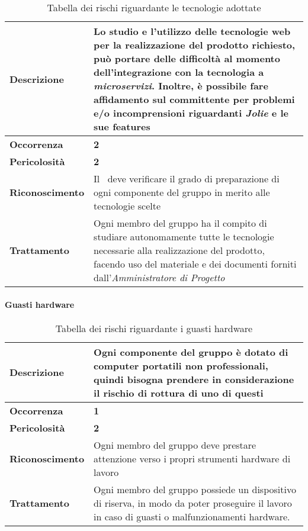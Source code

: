 \begin{table}[H]
	\begin{center}
		\begin{tabular}{|>{\centering\arraybackslash} m{3cm}  ||>{\centering\arraybackslash} m{10cm}|}
			\hline
			\textbf{Descrizione}	& Lo studio e l'utilizzo delle tecnologie web per la realizzazione del prodotto richiesto, può portare delle difficoltà al momento dell'integrazione con la tecnologia a \textit{microservizi\ped{G}}. Inoltre, è possibile fare affidamento sul committente per problemi e/o incomprensioni riguardanti \textit{Jolie\ped{G}} e le sue features \\
			\hline
			\textbf{Occorrenza}	&	\textbf{2}	\\
			\hline
			\textbf{Pericolosità}	&	\textbf{2}	\\
			\hline
			\textbf{Riconoscimento}	&	Il \textit{\RdP}\ deve verificare il grado di preparazione di ogni componente del gruppo in merito alle tecnologie scelte	\\
			\hline
			\textbf{Trattamento}	&	Ogni membro del gruppo ha il compito di studiare autonomamente tutte le tecnologie necessarie alla realizzazione del prodotto, facendo uso del materiale e dei documenti forniti dall’\textit{Amministratore di Progetto}	\\
			\hline
		\end{tabular}
	\caption{Tabella dei rischi riguardante le tecnologie adottate}
	\end{center}
\end{table}

\paragraph{Guasti hardware}

\begin{table}[H]
	\begin{center}
		\begin{tabular}{|>{\centering\arraybackslash} m{3cm}  ||>{\centering\arraybackslash} m{10cm}|}
			\hline
			\textbf{Descrizione}	& Ogni componente del gruppo è dotato di computer portatili non professionali, quindi bisogna prendere in considerazione il rischio di rottura di uno di questi \\
			\hline
			\textbf{Occorrenza}	&	\textbf{1}	\\
			\hline
			\textbf{Pericolosità}	&	\textbf{2}	\\
			\hline
			\textbf{Riconoscimento}	&	Ogni membro del gruppo deve prestare attenzione verso i propri strumenti hardware di lavoro	\\
			\hline
			\textbf{Trattamento}	&	Ogni membro del gruppo possiede un dispositivo di riserva, in modo da poter proseguire il lavoro in caso di guasti o malfunzionamenti hardware.	\\
			\hline
		\end{tabular}
		\caption{Tabella dei rischi riguardante i guasti hardware}
	\end{center}
\end{table}


